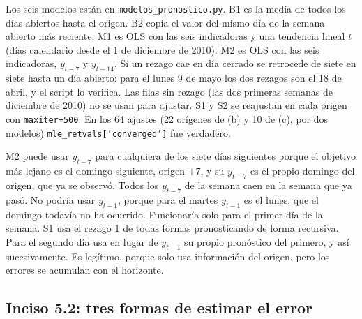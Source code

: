 \documentclass[11pt]{article}
\begin{document}
Los seis modelos están en \texttt{modelos\_pronostico.py}. B1 es la media de todos los días
abiertos hasta el origen. B2 copia el valor del mismo día de la semana abierto más reciente. M1 es
OLS con las seis indicadoras y una tendencia lineal $t$ (días calendario desde el 1 de diciembre
de 2010). M2 es OLS con las seis indicadoras, $y_{t-7}$ y $y_{t-14}$. Si un rezago cae en día
cerrado se retrocede de siete en siete hasta un día abierto: para el lunes 9 de mayo los dos
rezagos son el 18 de abril, y el script lo verifica. Las filas sin rezago (las dos primeras
semanas de diciembre de 2010) no se usan para ajustar. S1 y S2 se reajustan en cada origen con
\texttt{maxiter=500}. En los 64 ajustes (22 orígenes de (b) y 10 de (c), por dos modelos)
\texttt{mle\_retvals['converged']} fue verdadero.

M2 puede usar $y_{t-7}$ para cualquiera de los siete días siguientes porque el objetivo
más lejano es el domingo siguiente, origen $+7$, y su $y_{t-7}$ es el propio domingo del origen,
que ya se observó. Todos los $y_{t-7}$ de la semana caen en la semana que ya pasó. No podría
usar $y_{t-1}$, porque para el martes $y_{t-1}$ es el lunes, que el domingo todavía no ha
ocurrido. Funcionaría solo para el primer día de la semana. S1 usa el rezago 1 de todas
formas pronosticando de forma recursiva. Para el segundo día usa en lugar de $y_{t-1}$ su propio
pronóstico del primero, y así sucesivamente. Es legítimo, porque solo usa información del origen,
pero los errores se acumulan con el horizonte.

\subsection*{Inciso 5.2: tres formas de estimar el error}
\end{document}
